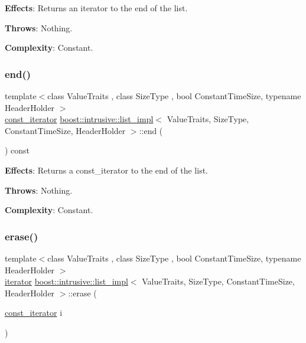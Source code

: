 {\bfseries Effects}\+: Returns an iterator to the end of the list.

{\bfseries Throws}\+: Nothing.

{\bfseries Complexity}\+: Constant. \mbox{\label{classboost_1_1intrusive_1_1list__impl_a797bd19e3f14f42d556bb85de2fc1ac3}} 
\subsubsection{\texorpdfstring{end()}{end()}\hspace{0.1cm}{\footnotesize\ttfamily [2/2]}}
{\footnotesize\ttfamily template$<$class Value\+Traits , class Size\+Type , bool Constant\+Time\+Size, typename Header\+Holder $>$ \\
\hyperlink{classboost_1_1intrusive_1_1list__impl_af4ced710fe02662c5650d161af83d8cd}{const\+\_\+iterator} \hyperlink{classboost_1_1intrusive_1_1list__impl}{boost\+::intrusive\+::list\+\_\+impl}$<$ Value\+Traits, Size\+Type, Constant\+Time\+Size, Header\+Holder $>$\+::end (\begin{DoxyParamCaption}{ }\end{DoxyParamCaption}) const\hspace{0.3cm}{\ttfamily [inline]}}

{\bfseries Effects}\+: Returns a const\+\_\+iterator to the end of the list.

{\bfseries Throws}\+: Nothing.

{\bfseries Complexity}\+: Constant. \mbox{\label{classboost_1_1intrusive_1_1list__impl_a5b8579de073832e53c545fe5cca65057}} 
\subsubsection{\texorpdfstring{erase()}{erase()}\hspace{0.1cm}{\footnotesize\ttfamily [1/3]}}
{\footnotesize\ttfamily template$<$class Value\+Traits , class Size\+Type , bool Constant\+Time\+Size, typename Header\+Holder $>$ \\
\hyperlink{classboost_1_1intrusive_1_1list__impl_a15c0189bf62eb9fb98bc07ef10b8cb23}{iterator} \hyperlink{classboost_1_1intrusive_1_1list__impl}{boost\+::intrusive\+::list\+\_\+impl}$<$ Value\+Traits, Size\+Type, Constant\+Time\+Size, Header\+Holder $>$\+::erase (\begin{DoxyParamCaption}\item[{\hyperlink{classboost_1_1intrusive_1_1list__impl_af4ced710fe02662c5650d161af83d8cd}{const\+\_\+iterator}}]{i }\end{DoxyParamCaption})\hspace{0.3cm}{\ttfamily [inline]}}

